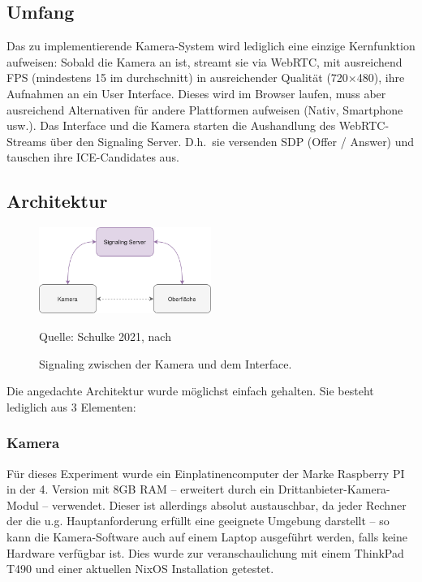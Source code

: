 \documentclass{article}
\newcommand{\figuresource}[1]{
	\begin{center}Quelle: #1\end{center}
}
\begin{document}
\begin{onecolumn}
\subsection{Umfang}

Das zu implementierende Kamera-System wird lediglich eine einzige
Kernfunktion aufweisen: Sobald die Kamera an ist, streamt sie via
WebRTC, mit ausreichend FPS (mindestens 15 im durchschnitt) in
ausreichender Qualität (720$\times$480), ihre Aufnahmen an ein User
Interface. Dieses wird im Browser laufen, muss aber ausreichend
Alternativen für andere Plattformen aufweisen (Nativ, Smartphone
usw.). Das Interface und die Kamera starten die Aushandlung des
WebRTC-Streams über den Signaling Server. D.h.\ sie versenden SDP
(Offer / Answer) und tauschen ihre ICE-Candidates aus.

\subsection{Architektur}

\begin{figure}[ht]
	\includegraphics[width=0.5\textwidth]{diagram-signaling}
	\centering
	\caption{Signaling zwischen der Kamera und dem Interface.}
	\figuresource{Schulke 2021, nach~\cite{WebRTC}}
\end{figure}

Die angedachte Architektur wurde möglichst einfach gehalten. Sie besteht
lediglich aus 3 Elementen:

\subsubsection{Kamera}

Für dieses Experiment wurde ein Einplatinencomputer der Marke Raspberry PI in
der 4. Version mit 8GB RAM – erweitert durch ein Drittanbieter-Kamera-Modul –
verwendet. Dieser ist allerdings absolut austauschbar, da jeder Rechner der
die u.g. Hauptanforderung erfüllt eine geeignete Umgebung darstellt – so kann
die Kamera-Software auch auf einem Laptop ausgeführt werden, falls keine
Hardware verfügbar ist. Dies wurde zur veranschaulichung mit einem ThinkPad
T490 und einer aktuellen NixOS Installation getestet.


\end{onecolumn}
\end{document}
